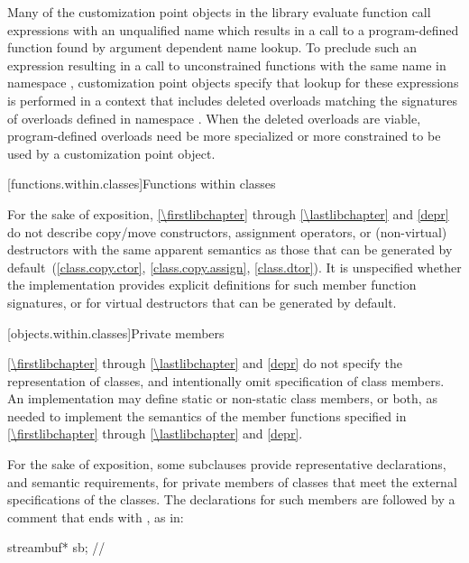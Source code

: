 \pnum
\begin{note}
Many of the customization point objects in the library evaluate function call
expressions with an unqualified name which results in a call to a
program-defined function found by argument dependent name
lookup. To preclude such an expression resulting in a
call to unconstrained functions with the same name in namespace ,
customization point objects specify that lookup for these expressions is
performed in a context that includes deleted overloads matching the signatures
of overloads defined in namespace . When the deleted overloads are
viable, program-defined overloads need be more specialized
or more constrained to be used by a customization point
object.
\end{note}

[functions.within.classes]{Functions within classes}

\pnum
For the sake of exposition, \ref{\firstlibchapter} through \ref{\lastlibchapter}
and \ref{depr} do not describe copy/move constructors, assignment
operators, or (non-virtual) destructors with the same apparent
semantics as those that can be generated
by default~(\ref{class.copy.ctor}, \ref{class.copy.assign}, \ref{class.dtor}).
%
%
%
It is unspecified whether
the implementation provides explicit definitions for such member function
signatures, or for virtual destructors that can be generated by default.

[objects.within.classes]{Private members}

\pnum
\ref{\firstlibchapter} through \ref{\lastlibchapter} and
\ref{depr} do not specify the representation of classes, and intentionally
omit specification of class members. An implementation may
define static or non-static class members, or both, as needed to implement the
semantics of the member functions specified in \ref{\firstlibchapter}
through \ref{\lastlibchapter} and \ref{depr}.

\pnum
For the sake of exposition,
some subclauses provide representative declarations, and semantic requirements, for
private members of classes that meet the external specifications of the classes.
The declarations for such members are
followed by a comment that ends with \expos, as in:

\begin{codeblock}
streambuf* sb;  // \expos
\end{codeblock}


